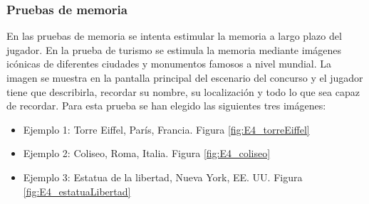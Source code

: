 \subsubsection{Pruebas de memoria}


En las pruebas de memoria se intenta estimular la memoria a largo plazo del jugador. En la prueba de turismo se estimula la memoria mediante imágenes icónicas de diferentes ciudades y monumentos famosos a nivel mundial. La imagen se muestra en la pantalla principal del escenario del concurso y el jugador tiene que describirla, recordar su nombre, su localización y todo lo que sea capaz de recordar. Para esta prueba se han elegido las siguientes tres imágenes: 

\begin{itemize}
    \item {Ejemplo 1: Torre Eiffel, París, Francia. Figura \ref{fig:E4_torreEiffel}}
    \item {Ejemplo 2: Coliseo, Roma, Italia. Figura \ref{fig:E4_coliseo}}
    \item {Ejemplo 3: Estatua de la libertad, Nueva York, EE. UU. Figura \ref{fig:E4_estatuaLibertad}}
\end{itemize}




